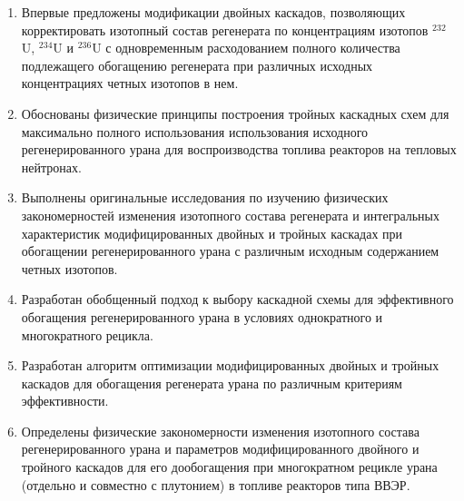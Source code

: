 {\novelty}
\begin{enumerate}
  \item Впервые предложены модификации двойных каскадов, позволяющих корректировать
  изотопный состав регенерата по концентрациям изотопов $^{232}$U, $^{234}$U и $^{236}$U с одновременным расходованием полного количества подлежащего обогащению регенерата при различных исходных концентрациях четных изотопов в нем.
  \item Обоснованы физические принципы построения тройных каскадных схем для максимально полного использования использования исходного регенерированного урана для воспроизводства топлива реакторов на тепловых нейтронах.
  \item Выполнены оригинальные исследования по изучению физических закономерностей изменения изотопного состава регенерата и интегральных характеристик модифицированных двойных и тройных каскадах при обогащении регенерированного урана с различным исходным содержанием четных изотопов.
  \item Разработан обобщенный подход к выбору каскадной схемы для эффективного обогащения регенерированного урана в условиях однократного и многократного рецикла.
  \item Разработан алгоритм оптимизации модифицированных двойных и тройных каскадов для обогащения регенерата урана по различным критериям
  эффективности.
  \item Определены физические закономерности изменения изотопного состава регенерированного урана и параметров модифицированного двойного и тройного каскадов для его дообогащения при многократном рецикле урана (отдельно и совместно с плутонием) в топливе реакторов типа ВВЭР.
\end{enumerate}

